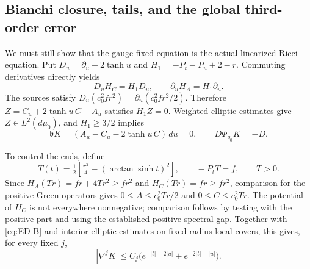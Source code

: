 \documentclass[a4paper,11pt]{article}
\numberwithin{equation}{section}
\theoremstyle{definition}
\begin{document}
\subsection{Bianchi closure, tails, and the global third-order error}\label{sec:ED-third-gluing}
We must still show that the gauge-fixed equation is the actual linearized Ricci equation. Put
$D_u=\partial_u+2\tanh u$ and $H_1=-P_t-P_u+2-r$.
Commuting derivatives directly yields
\[
D_uH_C=H_1D_u,\qquad \partial_uH_A=H_1\partial_u.
\]
The sources satisfy $D_u(c_0^2fr^2)=\partial_u(c_0^2fr^2/2)$.
Therefore $Z=C_u+2\tanh u\,C-A_u$ satisfies $H_1Z=0$.
Weighted elliptic estimates give $Z\in L^2(d\mu_0)$,
and $H_1\ge3/2$ implies
\begin{equation}\label{eq:ED-bianchi}
\mathfrak bK=(A_u-C_u-2\tanh u\,C)\,du=0,\qquad
D\Phi_{g_0}K=-D.
\end{equation}

To control the ends, define
\[
T(t)=\tfrac12\left[\tfrac{\pi^2}{4}-(\arctan\sinh t)^2\right],
\qquad -P_tT=f,\qquad T>0.
\]
Since $H_A(Tr)=fr+4Tr^2\ge fr^2$ and
$H_C(Tr)=fr\ge fr^2$, comparison for the positive Green operators gives
$0\le A\le c_0^2Tr/2$ and $0\le C\le c_0^2Tr$.
The potential of $H_C$ is not everywhere nonnegative; comparison follows by testing with the positive part and using the established positive spectral gap.
Together with \eqref{eq:ED-B} and interior elliptic estimates on fixed-radius local covers,
this gives, for every fixed $j$,
\begin{equation}\label{eq:ED-decay}
|\nabla^jK|\le C_j
\bigl(e^{-|t|-2|u|}+e^{-2|t|-|u|}\bigr).
\end{equation}
\end{document}
